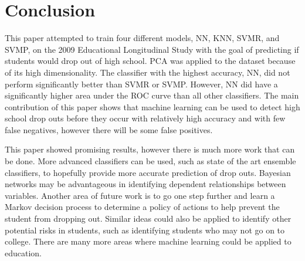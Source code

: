 \documentclass[twoside,11pt]{article}
\begin{document}
\begin{figure}[htbp]
  \label{fig:tuning}
\end{figure}

\section{Conclusion}

This paper attempted to train four different models, NN, KNN, SVMR, and SVMP,
on the 2009 Educational Longitudinal Study with the goal of predicting if
students would drop out of high school.  PCA was applied to the dataset because
of its high dimensionality.  The classifier with the highest accuracy, NN, did
not perform significantly better than SVMR or SVMP.  However, NN did have a
significantly higher area under the ROC curve than all other classifiers.  The
main contribution of this paper shows that machine learning can be used to
detect high school drop outs before they occur with relatively high accuracy
and with few false negatives, however there will be some false positives.

This paper showed promising results, however there is much more work that can
be done.  More advanced classifiers can be used, such as state of the art
ensemble classifiers, to hopefully provide more accurate prediction of drop
outs.  Bayesian networks may be advantageous in identifying dependent
relationships between variables.  Another area of future work is to go one step
further and learn a Markov decision process to determine a policy of actions to
help prevent the student from dropping out.  Similar ideas could also be
applied to identify other potential risks in students, such as identifying
students who may not go on to college.  There are many more areas where machine
learning could be applied to education.  



\end{document}
